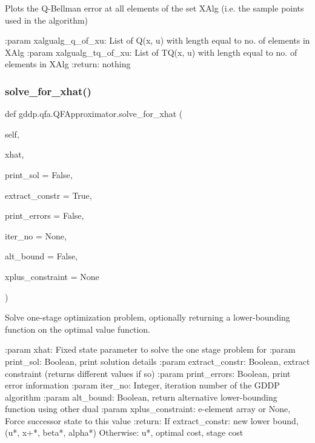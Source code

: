 \begin{DoxyVerb}Plots the Q-Bellman error at all elements of the set XAlg (i.e. the sample points used in
the algorithm)

:param xalgualg_q_of_xu: List of Q(x, u) with length equal to no. of elements in XAlg
:param xalgualg_tq_of_xu: List of TQ(x, u) with length equal to no. of elements in XAlg
:return: nothing
\end{DoxyVerb}
 \mbox{\label{classgddp_1_1qfa_1_1_q_f_approximator_aebd6f739abd857ff3f453f695a0176d3}} 
\subsubsection{\texorpdfstring{solve\_for\_xhat()}{solve\_for\_xhat()}}
{\footnotesize\ttfamily def gddp.\+qfa.\+Q\+F\+Approximator.\+solve\+\_\+for\+\_\+xhat (\begin{DoxyParamCaption}\item[{}]{self,  }\item[{}]{xhat,  }\item[{}]{print\+\_\+sol = {\ttfamily False},  }\item[{}]{extract\+\_\+constr = {\ttfamily True},  }\item[{}]{print\+\_\+errors = {\ttfamily False},  }\item[{}]{iter\+\_\+no = {\ttfamily None},  }\item[{}]{alt\+\_\+bound = {\ttfamily False},  }\item[{}]{xplus\+\_\+constraint = {\ttfamily None} }\end{DoxyParamCaption})}

\begin{DoxyVerb}Solve one-stage optimization problem, optionally returning a lower-bounding function
on the optimal value function.

:param xhat: Fixed state parameter to solve the one stage problem for
:param print_sol: Boolean, print solution details
:param extract_constr: Boolean, extract constraint (returns different values if so)
:param print_errors: Boolean, print error information
:param iter_no: Integer, iteration number of the GDDP algorithm
:param alt_bound: Boolean, return alternative lower-bounding function using other dual
:param xplus_constraint: e-element array or None, Force successor state to this value
:return: If extract_constr: new lower bound, (u*, x+*, beta*, alpha*)
 Otherwise: u*, optimal cost, stage cost
\end{DoxyVerb}
 

